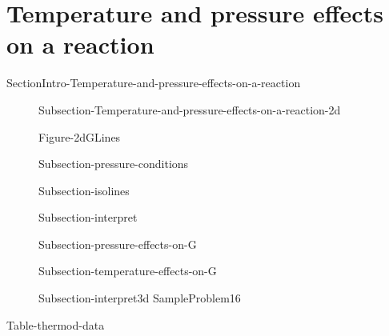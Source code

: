 \documentclass[main.tex]{subfiles}
\begin{document}
\section{Temperature and pressure effects on a reaction}{SectionIntro-Temperature-and-pressure-effects-on-a-reaction}
\sloppy\begin{description}
\item[] {Subsection-Temperature-and-pressure-effects-on-a-reaction-2d}
\hspace{8cm} \begin{center}{Figure-2dGLines}\end{center}
\item[] {Subsection-pressure-conditions}
\item[] {Subsection-isolines}
\item[] {Subsection-interpret}
\item[] {Subsection-pressure-effects-on-G}
\item[] {Subsection-temperature-effects-on-G}
\item[] {Subsection-interpret3d}
{SampleProblem16}

\newpage
\hspace{6cm}{Figure-2dG}
 \end{description}






{Table-thermod-data}
\end{document}
